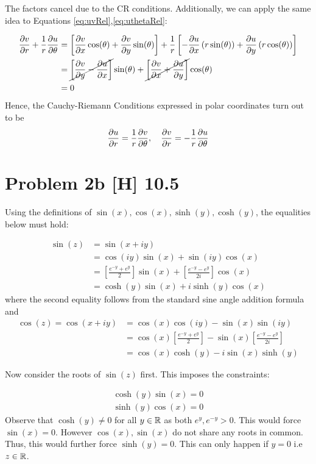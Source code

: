 \documentclass[12pt]{article}%
\begin{document}
The factors cancel due to the CR conditions. Additionally, we can apply the same idea to Equations \ref{eq:uvRel},\ref{eq:uthetaRel}:

\begin{align*}
  \frac{\partial{v}}{\partial{r}} + \frac{1}{r}\frac{\partial{u}}{\partial{\theta}} & = \left[\frac{\partial{v}}{\partial{x}} \cos(\theta) + \frac{\partial{v}}{\partial{y}}\sin(\theta)\right] + \frac{1}{r}\left[- \frac{\partial{u}}{\partial{x}}\left(r \sin(\theta)\right) + \frac{\partial{u}}{\partial{y}}\left(r\cos(\theta)\right) \right] \\
  & = \cancel{\left[\frac{\partial{v}}{\partial{y}} - \frac{\partial{u}}{\partial{x}}\right]}\sin(\theta) + \cancel{\left[\frac{\partial{v}}{\partial{x}} + \frac{\partial{u}}{\partial{y}}\right]}\cos(\theta) \\
  & = 0
\end{align*}
Hence, the Cauchy-Riemann Conditions expressed in polar coordinates turn out to be \[\frac{\partial{u}}{\partial{r}} =  \frac{1}{r}\frac{\partial{v}}{\partial{\theta}}, \quad \frac{\partial{v}}{\partial{r}} = - \frac{1}{r}\frac{\partial{u}}{\partial{\theta}}\]

\section{Problem 2b [H] 10.5}

Using the definitions of $\sin(x), \cos(x), \sinh(y), \cosh(y)$, the equalities below must hold:

\begin{align*}
  \sin(z) & = \sin(x + iy) \\
          & = \cos(iy)\sin(x) + \sin(iy)\cos(x) \\
          & = \left[\frac{e^{-y} + e^{y}}{2}\right]\sin(x) + \left[\frac{e^{-y} - e^{y}}{2i}\right]\cos(x) \\
          & = \cosh(y)\sin(x)+ i \sinh(y)\cos(x)
\end{align*}
where the second equality follows from the standard sine angle addition formula and
\begin{align*}
  \cos(z) = \cos(x + iy) & = \cos(x)\cos(iy) - \sin(x)\sin(iy) \\
  & = \cos(x)\left[\frac{e^{-y} + e^{y}}{2}\right] - \sin(x)\left[\frac{e^{-y} - e^{y}}{2i}\right] \\
  & = \cos(x)\cosh(y) - i \sin(x)\sinh(y)
\end{align*}

Now consider the roots of $\sin(z)$ first. This imposes the constraints:

\begin{align*}
  \cosh(y)\sin(x) = 0 \\
  \sinh(y)\cos(x) = 0
\end{align*}
Observe that $\cosh(y) \neq 0$ for all $y \in {\mathbb{R}}$ as both $e^y, e^{-y} > 0$. This would force $\sin(x) = 0$. However $\cos(x),\sin(x)$ do not share any roots in common. Thus, this would further force $\sinh(y) = 0$. This can only happen if $y = 0$ i.e $z \in {\mathbb{R}}$. \newline
\end{document}
